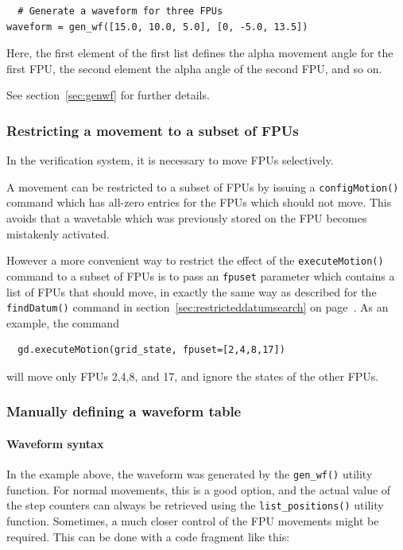 \documentclass[11pt,a4paper]{report}
\begin{document}
\begin{verbatim}
  # Generate a waveform for three FPUs
waveform = gen_wf([15.0, 10.0, 5.0], [0, -5.0, 13.5])
\end{verbatim}

Here, the first element of the first list
defines the alpha movement angle for the
first FPU, the second element the alpha
angle of the second FPU, and so on.

See section~\ref{sec:genwf} for further details.

\subsubsection{Restricting a movement to a subset of FPUs}
  In the verification system, it is necessary
to move FPUs selectively.

A movement can be restricted to a subset of FPUs by issuing a
\texttt{configMotion()} command which has all-zero entries for the FPUs
which should not move. This avoids that a wavetable which was
previously stored on the FPU becomes mistakenly activated.

However a more convenient way to restrict the effect
of the \texttt{executeMotion()} command to a
subset of FPUs is to pass an \texttt{fpuset} parameter
which contains a list of FPUs that should move,
in exactly the same way as described for the \texttt{findDatum()}
command in section~\ref{sec:restricteddatumsearch}
on page~\pageref{sec:restricteddatumsearch}. As an example,
the command
\begin{verbatim}
  gd.executeMotion(grid_state, fpuset=[2,4,8,17])
\end{verbatim}
will move only FPUs 2,4,8, and 17, and ignore the states of the other
FPUs.


\subsubsection{Manually defining a waveform table}
\label{sec:waveform_rules}
\paragraph{Waveform syntax}

In the example above, the waveform was generated by the
\texttt{gen\_wf()} utility function.  For normal movements, this is a
good option, and the actual value of the step counters can always be
retrieved using the \texttt{list\_positions()} utility
function. Sometimes, a much closer control of the FPU movements might
be required. This can be done with a code fragment like this:
\end{document}
